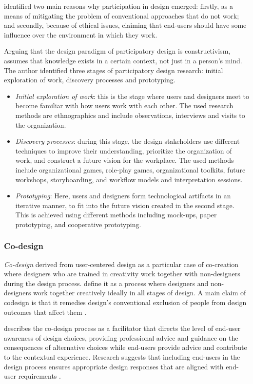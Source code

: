 \documentclass[preprint,12pt]{elsarticle}
\begin{document}
\citet{dearnley1983favour}identified two main reasons why participation in design emerged: firstly, as a means of mitigating the problem of conventional approaches that do not work; and secondly, because of ethical issues, claiming that end-users should have some influence over the environment in which they work.

Arguing that the design paradigm of participatory design is constructivism,\citet{spinuzzi2005methodology} assumes that knowledge exists in a certain context, not just in a person’s mind. The author identified three stages of participatory design research: initial exploration of work, discovery processes and prototyping. 
\begin{itemize}
    \item \textit{Initial exploration of work}: this is the stage where users and designers meet to become familiar with how users work with each other. The used research methods are ethnographics and include observations, interviews and visits to the organization.
    \item \textit{Discovery processes}: during this stage, the design stakeholders use different techniques to improve their understanding, prioritize the organization of work, and construct a future vision for the workplace. The used methods include organizational games, role-play games, organizational toolkits, future workshops, storyboarding, and workflow models and interpretation sessions.
    \item \textit{Prototyping}: Here, users and designers form technological artifacts in an iterative manner, to fit into the future vision created in the second stage. This is achieved using different methods including mock-ups, paper prototyping, and cooperative prototyping.
\end{itemize}

\subsubsection{Co-design}
\textit{Co-design} derived from user-centered design as a particular case of co-creation where designers who are trained in creativity work together with non-designers during the design process. \cite{Sanders2008} define it as a process where designers and non-designers work together creatively ideally in all stages of design. A main claim of codesign is that it remedies design’s conventional exclusion of people from design outcomes that affect them \cite{taffe2015hybrid}.

\cite{siu2003users} describes the co-design process as a facilitator that directs the level of end-user awareness of design choices, providing professional advice and guidance on the consequences of alternative choices while end-users provide advice and contribute to the contextual experience.  Research suggests that including end-users in the design process ensures appropriate design responses that are aligned with end-user requirements \cite{taffe2015hybrid}. 
\end{document}
